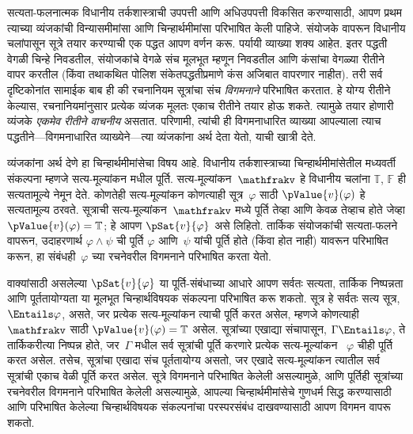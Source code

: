 \documentclass[11pt,a4paper,openany]{book}
\theoremstyle{definition}
\newcommand{\applytofirst}[2]{{\expandafter#1#2}}
\newcommand{\True}{\ensuremath{\mathbb{T}}}
\newcommand{\False}{\ensuremath{\mathbb{F}}}
\newcommand{\pAssign}[1]{\applytofirst{\mathfrak}{#1}}
\begin{document}
सत्यता-फलनात्मक विधानीय तर्कशास्त्राची उपपत्ती आणि अधिउपपत्ती
विकसित करण्यासाठी, आपण प्रथम त्याच्या व्यंजकांची विन्यासमीमांसा
आणि चिन्हार्थमीमांसा परिभाषित केली पाहिजे. संयोजके वापरून
विधानीय चलांपासून सूत्रे तयार करण्याची एक
पद्धत आपण वर्णन करू. पर्यायी व्याख्या शक्य आहेत. इतर पद्धती वेगळी
चिन्हे निवडतील, संयोजकांचे वेगळे संच मूलभूत म्हणून निवडतील आणि
कंसांचा वेगळ्या रीतीने वापर करतील (किंवा तथाकथित पोलिश
संकेतपद्धतीप्रमाणे कंस अजिबात वापरणार नाहीत). तरी सर्व दृष्टिकोनांत
सामाईक बाब ही की रचनानियम सूत्रांचा संच \emph{विगमनाने}
परिभाषित करतात. हे योग्य रीतीने केल्यास, रचनानियमांनुसार प्रत्येक
व्यंजक मूलतः एकाच रीतीने तयार होऊ शकते. त्यामुळे तयार होणारी
व्यंजके \emph{एकमेव रीतीने वाचनीय} असतात. परिणामी, त्यांची ही
विगमनाधारित व्याख्या आपल्याला त्याच पद्धतीने---विगमनाधारित
व्याख्येने---त्या व्यंजकांना अर्थ देता येतो, याची खात्री देते.

व्यंजकांना अर्थ देणे हा चिन्हार्थमीमांसेचा विषय आहे. विधानीय
तर्कशास्त्राच्या चिन्हार्थमीमांसेतील मध्यवर्ती संकल्पना म्हणजे
सत्य-मूल्यांकन मधील पूर्ति. सत्य-मूल्यांकन~$\pAssign{v}$ हे
विधानीय चलांना $\True$, $\False$ ही सत्यतामूल्ये
नेमून देते. कोणतेही सत्य-मूल्यांकन कोणत्याही सूत्र~$\varphi$
साठी $\pValue{v}(\varphi)$ हे सत्यतामूल्य ठरवते. सूत्राची
सत्य-मूल्यांकन~$\pAssign{v}$ मध्ये पूर्ति तेव्हा आणि केवळ तेव्हाच
होते जेव्हा $\pValue{v}(\varphi) = \True$; हे आपण $\pSat{v}{\varphi}$ असे
लिहितो. तार्किक संयोजकांची सत्यता-फलने वापरून, उदाहरणार्थ
$\varphi \land \psi$ ची पूर्ति $\varphi$ आणि~$\psi$ यांची पूर्ति होते (किंवा
होत नाही) यावरून परिभाषित करून, हा संबंधही~$\varphi$ च्या रचनेवरील
विगमनाने परिभाषित करता येतो.

वाक्यांसाठी असलेल्या $\pSat{v}{\varphi}$ या पूर्ति-संबंधाच्या आधारे
आपण सर्वतः सत्यता, तार्किक निष्पन्नता आणि पूर्ततायोग्यता या मूलभूत
चिन्हार्थविषयक संकल्पना परिभाषित करू शकतो. सूत्र हे सर्वतः
सत्य सूत्र, $\Entails \varphi$, असते, जर प्रत्येक सत्य-मूल्यांकन त्याची
पूर्ति करत असेल, म्हणजे कोणत्याही~$\pAssign{v}$ साठी
$\pValue{v}(\varphi) = \True$ असेल. सूत्रांच्या एखाद्या संचापासून,
$\Gamma \Entails \varphi$, ते तार्किकरीत्या निष्पन्न होते, जर~$\Gamma$
मधील सर्व सूत्रांची पूर्ति करणारे प्रत्येक सत्य-मूल्यांकन
~$\varphi$ चीही पूर्ति करत असेल. तसेच, सूत्रांचा एखादा संच
पूर्ततायोग्य असतो, जर एखादे सत्य-मूल्यांकन त्यातील सर्व सूत्रांची एकाच वेळी पूर्ति करत असेल. सूत्रे विगमनाने
परिभाषित केलेली असल्यामुळे, आणि पूर्तिही सूत्रांच्या रचनेवरील
विगमनाने परिभाषित केलेली असल्यामुळे, आपल्या चिन्हार्थमीमांसेचे
गुणधर्म सिद्ध करण्यासाठी आणि परिभाषित केलेल्या चिन्हार्थविषयक
संकल्पनांचा परस्परसंबंध दाखवण्यासाठी आपण विगमन वापरू शकतो.
\end{document}
